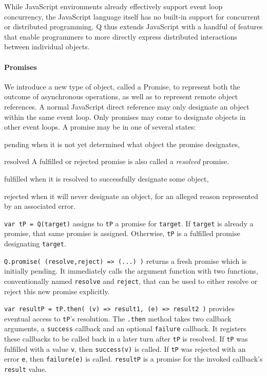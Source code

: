 \documentclass{llncs}
\begin{document}
While JavaScript environments already effectively support event loop concurrency, the JavaScript language itself has no built-in support for concurrent or distributed programming. Q thus extends JavaScript with a handful of features that enable programmers to more directly express distributed interactions between individual objects.

\paragraph{Promises}

We introduce a new type of object, called a Promise, to represent both the outcome of asynchronous operations, as well as to represent remote object references. A normal JavaScript direct reference may only designate an object within the same event loop. Only promises may come to designate objects in other event loops. A promise may be in one of several states:

\begin{description*}
  \item[pending] when it is not yet determined what object the promise designates,
  \item[resolved] A fulfilled or rejected promise is also called a \emph{resolved} promise.
  \begin{description*}
    \item[fulfilled] when it is resolved to successfully designate some object,
    \item[rejected] when it will never designate an object, for an alleged reason represented by an associated error.
  \end{description*}
\end{description*}


\begin{description*}
\item[{\tt var tP = Q(target)}] assigns to {\tt tP} a promise for {\tt target}. If {\tt target} is already a promise, that same promise is assigned. Otherwise, {\tt tP} is a fulfilled promise designating {\tt target}.

\item[{\tt Q.promise( (resolve,reject) => (...) )}] returns a fresh promise which is initially pending. It immediately calls the argument function with two functions, conventionally named {\tt resolve} and {\tt reject}, that can be used to either resolve or reject this new promise explicitly. 

\item[{\tt var resultP = tP.then( (v) => result1, (e) => result2 )}] provides eventual access to {\tt tP}'s resolution. The {\tt .then} method takes two callback arguments, a \texttt{success} callback and an optional \texttt{failure} callback. It registers these callbacks to be called back in a later turn after {\tt tP} is resolved. If {\tt tP} was fulfilled with a value {\tt v}, then {\tt success(v)} is called. If {\tt tP} was rejected with an error {\tt e}, then {\tt failure(e)} is called. {\tt resultP} is a promise for the invoked callback's {\tt result} value. 
\end{description*}
\end{document}
